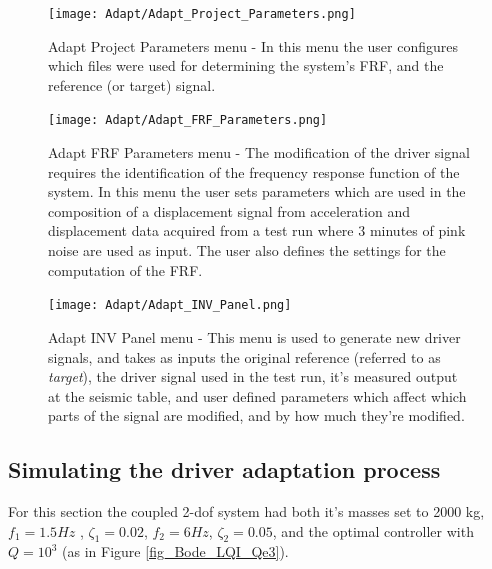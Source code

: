 \documentclass[9pt]{extarticle}
\begin{document}
\begin{figure}[H]
    \centering
    \texttt{[image: Adapt/Adapt\_Project\_Parameters.png]}
    \caption{Adapt Project Parameters menu - In this menu the user configures which files were used for determining the system's FRF, and the reference (or target) signal.}
    \label{fig:enter-label}
\end{figure}

\begin{figure}[H]
    \centering
    \texttt{[image: Adapt/Adapt\_FRF\_Parameters.png]}
    \caption{Adapt FRF Parameters menu - The modification of the driver signal requires the identification of the frequency response function of the system. In this menu the user sets parameters which are used in the composition of a displacement signal from acceleration and displacement data acquired from a test run where 3 minutes of pink noise are used as input. The user also defines the settings for the computation of the FRF.}
    \label{Adapt_FRF_Parameters}
\end{figure}

\begin{figure}[H]
    \centering
    \texttt{[image: Adapt/Adapt\_INV\_Panel.png]}
    \caption{Adapt INV Panel menu - This menu is used to generate new driver signals, and takes as inputs the original reference (referred to as \emph{target}), the driver signal used in the test run, it's measured output at the seismic table, and user defined parameters which affect which parts of the signal are modified, and by how much they're modified.}
    \label{Adapt_INV_Panel}
\end{figure}

\subsection{Simulating the driver adaptation process}

For this section the coupled 2-dof system had both it's masses set to 2000 kg, $f_1 = 1.5 Hz$ , $\zeta_1  = 0.02$, $f_2 = 6 Hz$, $\zeta_2 = 0.05$, and the optimal controller with $Q=10^3$ (as in Figure \ref{fig_Bode_LQI_Qe3}).
\end{document}
